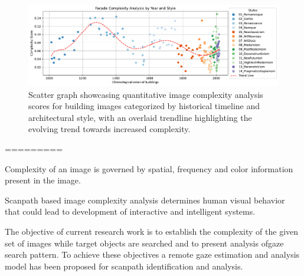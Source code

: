      \begin{figure}[htb]
          \centering
          \includegraphics[width= \linewidth]{Graphs/complexitygraph}
          \caption{Scatter graph showcasing quantitative image complexity analysis scores for building images categorized by historical timeline and architectural style, with an overlaid trendline highlighting the evolving trend towards increased complexity.}
          \label{fig:complexitygraph}
        \end{figure}


=========

 Complexity of an image is governed by spatial, frequency and color information present in the image.\cite{Ishrat2020}

Scanpath based image complexity analysis determines human visual behavior that could lead to development of interactive and intelligent systems.\cite{Ishrat2020}

The objective of current research work is to establish the complexity of the given set of images while target objects are searched and to present analysis ofgaze search pattern.
To achieve these objectives a remote gaze estimation and analysis model has been proposed for scanpath identification and analysis.\cite{Ishrat2020}




